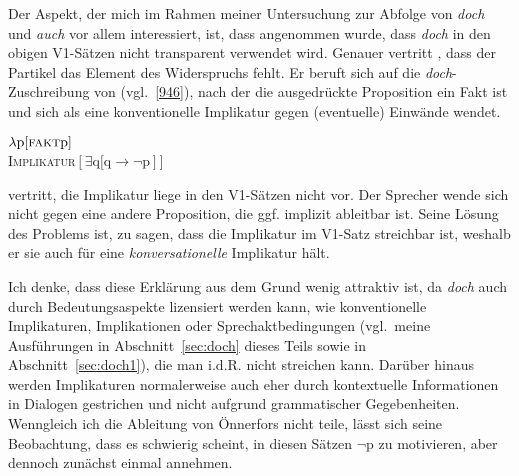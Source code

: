 {Der Aspekt, der mich im Rahmen meiner Untersuchung zur Abfolge von \textit{doch} und \textit{auch} vor allem interessiert, ist, dass angenommen wurde, dass \textit{doch} in den obigen V1-Sätzen nicht transparent verwendet wird. Genauer vertritt \citet[167]{Oennerfors1997}, dass der Partikel das Element des Widerspruchs fehlt. Er beruft sich auf die \textit{doch}-Zuschreibung von \citet{Ormelius-Sandblom1997} (vgl.\ \ref{946}), nach der die ausgedrückte Proposition ein	Fakt ist und sich als eine konventionelle Implikatur  gegen (eventuelle) Einwände wendet.

\begin{exe}
	\ex\label{946} 
		$\lambda \textrm{p[\textsc{fakt}p}]$\\
		\textsc{Implikatur}$[\exists \textrm{q[q} \rightarrow \neg \textrm{p}]]$
			\hfill\hbox{\citet[83]{Ormelius-Sandblom1997}}
\end{exe}
\citet[167]{Oennerfors1997} vertritt, die Implikatur liege in den V1-Sätzen nicht vor. Der Sprecher wende sich nicht gegen eine andere Proposition, die ggf. implizit ableitbar ist. Seine Lösung des Problems ist, zu sagen, dass die Implikatur im V1-Satz streichbar ist, weshalb er sie auch für eine \emph{konversationelle} Implikatur  hält.

Ich denke, dass diese Erklärung aus dem Grund wenig attraktiv ist, da \textit{doch} auch durch  Bedeutungsaspekte lizensiert werden kann, wie konventionelle Implikaturen, Implikationen  oder  Sprechaktbedingungen (vgl.\ meine Ausführungen in Abschnitt~\ref{sec:doch} dieses Teils sowie in Abschnitt~\ref{sec:doch1}), die man i.d.R. nicht streichen kann. Darüber hinaus werden Implikaturen normalerweise auch eher durch kontextuelle Informationen in Dialogen gestrichen und nicht aufgrund grammatischer Gegebenheiten. Wenngleich ich die Ableitung von Önnerfors nicht teile, lässt sich seine Beobachtung, dass es schwierig scheint, in diesen Sätzen $\neg$p zu motivieren, aber dennoch zunächst einmal annehmen.\pagebreak 

}
